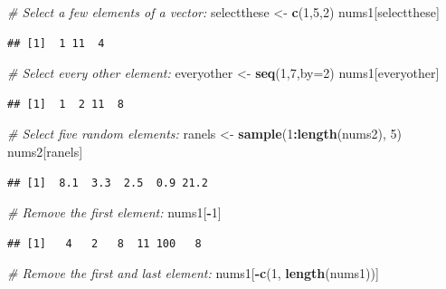\documentclass[]{book}
\newenvironment{Shaded}{\begin{snugshade}}{\end{snugshade}}
\newcommand{\CommentTok}[1]{\textcolor[rgb]{0.56,0.35,0.01}{\textit{#1}}}
\newcommand{\DataTypeTok}[1]{\textcolor[rgb]{0.13,0.29,0.53}{#1}}
\newcommand{\DecValTok}[1]{\textcolor[rgb]{0.00,0.00,0.81}{#1}}
\newcommand{\KeywordTok}[1]{\textcolor[rgb]{0.13,0.29,0.53}{\textbf{#1}}}
\newcommand{\NormalTok}[1]{#1}
\newcommand{\OperatorTok}[1]{\textcolor[rgb]{0.81,0.36,0.00}{\textbf{#1}}}
\newcommand{\StringTok}[1]{\textcolor[rgb]{0.31,0.60,0.02}{#1}}
\begin{document}
\begin{Shaded}
\begin{Highlighting}[]
\CommentTok{# Select a few elements of a vector:}
\NormalTok{selectthese <-}\StringTok{ }\KeywordTok{c}\NormalTok{(}\DecValTok{1}\NormalTok{,}\DecValTok{5}\NormalTok{,}\DecValTok{2}\NormalTok{)}
\NormalTok{nums1[selectthese]}
\end{Highlighting}
\end{Shaded}

\begin{verbatim}
## [1]  1 11  4
\end{verbatim}

\begin{Shaded}
\begin{Highlighting}[]
\CommentTok{# Select every other element:}
\NormalTok{everyother <-}\StringTok{ }\KeywordTok{seq}\NormalTok{(}\DecValTok{1}\NormalTok{,}\DecValTok{7}\NormalTok{,}\DataTypeTok{by=}\DecValTok{2}\NormalTok{)}
\NormalTok{nums1[everyother]}
\end{Highlighting}
\end{Shaded}

\begin{verbatim}
## [1]  1  2 11  8
\end{verbatim}

\begin{Shaded}
\begin{Highlighting}[]
\CommentTok{# Select five random elements:}
\NormalTok{ranels <-}\StringTok{ }\KeywordTok{sample}\NormalTok{(}\DecValTok{1}\OperatorTok{:}\KeywordTok{length}\NormalTok{(nums2), }\DecValTok{5}\NormalTok{)}
\NormalTok{nums2[ranels]}
\end{Highlighting}
\end{Shaded}

\begin{verbatim}
## [1]  8.1  3.3  2.5  0.9 21.2
\end{verbatim}

\begin{Shaded}
\begin{Highlighting}[]
\CommentTok{# Remove the first element:}
\NormalTok{nums1[}\OperatorTok{-}\DecValTok{1}\NormalTok{]}
\end{Highlighting}
\end{Shaded}

\begin{verbatim}
## [1]   4   2   8  11 100   8
\end{verbatim}

\begin{Shaded}
\begin{Highlighting}[]
\CommentTok{# Remove the first and last element:}
\NormalTok{nums1[}\OperatorTok{-}\KeywordTok{c}\NormalTok{(}\DecValTok{1}\NormalTok{, }\KeywordTok{length}\NormalTok{(nums1))]}
\end{Highlighting}
\end{Shaded}
\end{document}
